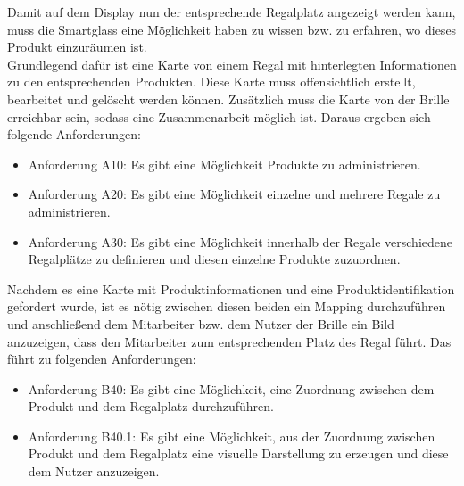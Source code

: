 Damit auf dem Display nun der entsprechende Regalplatz angezeigt werden kann, muss die Smartglass
eine Möglichkeit haben zu wissen bzw. zu erfahren, wo dieses Produkt einzuräumen ist. 
\\
Grundlegend dafür ist eine Karte von einem Regal mit hinterlegten Informationen zu den entsprechenden Produkten. Diese Karte muss offensichtlich erstellt, bearbeitet und gelöscht werden können. Zusätzlich muss die Karte von der Brille erreichbar sein, sodass eine Zusammenarbeit möglich ist. Daraus ergeben sich folgende Anforderungen:

\begin{itemize}
	\item Anforderung A10: Es gibt eine Möglichkeit Produkte zu administrieren.\label{anforderung_a10}
	\item Anforderung A20: Es gibt eine Möglichkeit einzelne und mehrere Regale zu administrieren. \label{anforderung_a20}
	\item Anforderung A30: Es gibt eine Möglichkeit innerhalb der Regale verschiedene Regalplätze zu definieren und diesen einzelne Produkte zuzuordnen. \label{anforderung_a30}
\end{itemize}

Nachdem es eine Karte mit Produktinformationen und eine Produktidentifikation gefordert wurde, ist es nötig zwischen diesen beiden ein Mapping durchzuführen und anschließend dem Mitarbeiter bzw. dem Nutzer der Brille ein Bild anzuzeigen, dass den Mitarbeiter zum entsprechenden Platz des Regal führt. Das führt zu folgenden Anforderungen:

\begin{itemize}
	\item Anforderung B40: Es gibt eine Möglichkeit, eine Zuordnung zwischen dem Produkt und dem Regalplatz durchzuführen. \label{anforderung_b40}
	\item Anforderung B40.1: Es gibt eine Möglichkeit, aus der Zuordnung zwischen Produkt und dem Regalplatz eine visuelle Darstellung zu erzeugen und diese dem Nutzer anzuzeigen.\label{anforderung_b40_1}
\end{itemize}

